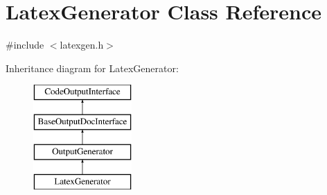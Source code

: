 \hypertarget{class_latex_generator}{}\section{Latex\+Generator Class Reference}
\label{class_latex_generator}


{\ttfamily \#include $<$latexgen.\+h$>$}

Inheritance diagram for Latex\+Generator\+:\begin{figure}[H]
\begin{center}
\leavevmode
\includegraphics[height=4.000000cm]{class_latex_generator}
\end{center}
\end{figure}
